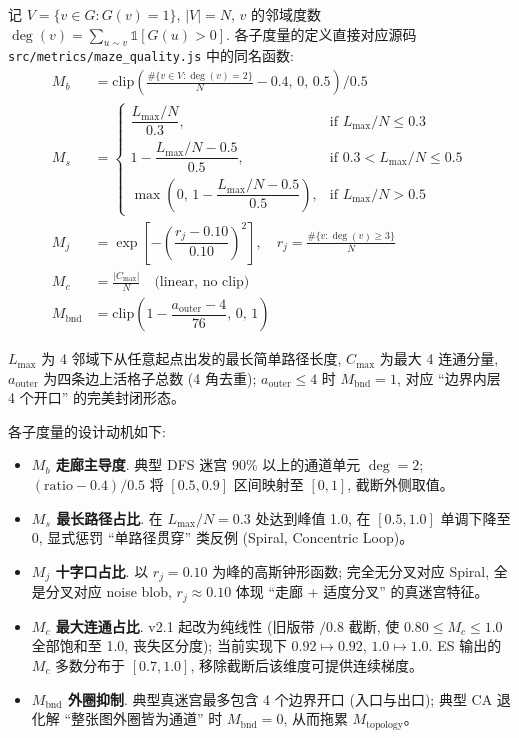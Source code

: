 记 $V = \{v \in G : G(v) = 1\}$, $|V| = N$, $v$ 的邻域度数 $\deg(v) = \sum_{u \sim v} \mathbb{1}[G(u) > 0]$. 各子度量的定义直接对应源码 \texttt{src/metrics/maze\_quality.js} 中的同名函数:
\begin{align}
  M_b &= \mathrm{clip}\!\left(\frac{\#\{v \in V : \deg(v) = 2\}}{N} - 0.4,\, 0,\, 0.5\right) \big/ 0.5 \label{eq:mb}\\
  M_s &= \begin{cases}
    \dfrac{L_{\max}/N}{0.3}, & \text{if } L_{\max}/N \le 0.3 \\
    1 - \dfrac{L_{\max}/N - 0.5}{0.5}, & \text{if } 0.3 < L_{\max}/N \le 0.5 \\
    \max\!\left(0,\, 1 - \dfrac{L_{\max}/N - 0.5}{0.5}\right), & \text{if } L_{\max}/N > 0.5
  \end{cases} \label{eq:ms}\\
  M_j &= \exp\!\left[-\left(\dfrac{r_j - 0.10}{0.10}\right)^{2}\right], \quad r_j = \frac{\#\{v : \deg(v) \ge 3\}}{N} \label{eq:mj}\\
  M_c &= \frac{|C_{\max}|}{N} \quad \text{(linear, no clip)} \label{eq:mc}\\
  M_{\text{bnd}} &= \mathrm{clip}\!\left(1 - \dfrac{a_{\text{outer}} - 4}{76},\, 0,\, 1\right) \label{eq:mbnd}
\end{align}

$L_{\max}$ 为 4 邻域下从任意起点出发的最长简单路径长度, $C_{\max}$ 为最大 4 连通分量, $a_{\text{outer}}$ 为四条边上活格子总数 (4 角去重); $a_{\text{outer}} \le 4$ 时 $M_{\text{bnd}} = 1$, 对应 ``边界内层 4 个开口'' 的完美封闭形态。

各子度量的设计动机如下:
\begin{itemize}[leftmargin=*, itemsep=0pt, topsep=0pt]
  \item \textbf{$M_b$ 走廊主导度}. 典型 DFS 迷宫 90\% 以上的通道单元 $\deg = 2$; $(\mathrm{ratio} - 0.4) / 0.5$ 将 $[0.5, 0.9]$ 区间映射至 $[0, 1]$, 截断外侧取值。
  \item \textbf{$M_s$ 最长路径占比}. 在 $L_{\max}/N = 0.3$ 处达到峰值 1.0, 在 $[0.5, 1.0]$ 单调下降至 0, 显式惩罚 ``单路径贯穿'' 类反例 (Spiral, Concentric Loop)。
  \item \textbf{$M_j$ 十字口占比}. 以 $r_j = 0.10$ 为峰的高斯钟形函数; 完全无分叉对应 Spiral, 全是分叉对应 noise blob, $r_j \approx 0.10$ 体现 ``走廊 + 适度分叉'' 的真迷宫特征。
  \item \textbf{$M_c$ 最大连通占比}. v2.1 起改为纯线性 (旧版带 $/0.8$ 截断, 使 $0.80 \le M_c \le 1.0$ 全部饱和至 1.0, 丧失区分度); 当前实现下 $0.92 \mapsto 0.92$, $1.0 \mapsto 1.0$. ES 输出的 $M_c$ 多数分布于 $[0.7, 1.0]$, 移除截断后该维度可提供连续梯度。
  \item \textbf{$M_{\text{bnd}}$ 外圈抑制}. 典型真迷宫最多包含 4 个边界开口 (入口与出口); 典型 CA 退化解 ``整张图外圈皆为通道'' 时 $M_{\text{bnd}} = 0$, 从而拖累 $M_{\text{topology}}$。
\end{itemize}

